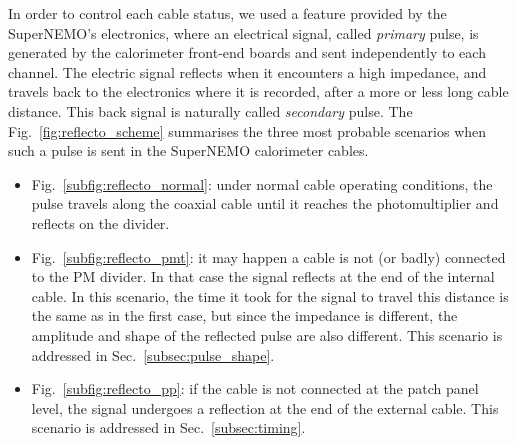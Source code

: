 In order to control each cable status, we used a feature provided by the SuperNEMO's electronics, where an electrical signal, called \emph{primary} pulse, is generated by the calorimeter front-end boards and sent independently to each channel.
The electric signal reflects when it encounters a high impedance, and travels back to the electronics where it is recorded, after a more or less long cable distance.
This back signal is naturally called \emph{secondary} pulse.
The Fig.~\ref{fig:reflecto_scheme} summarises the three most probable scenarios when such a pulse is sent in the SuperNEMO calorimeter cables.
\begin{itemize}
\item Fig.~\ref{subfig:reflecto_normal}: under normal cable operating conditions, the pulse travels along the coaxial cable until it reaches the photomultiplier and reflects on the divider.
\item Fig.~\ref{subfig:reflecto_pmt}: it may happen a cable is not (or badly) connected to the PM divider.
  In that case the signal reflects at the end of the internal cable.
  In this scenario, the time it took for the signal to travel this distance is the same as in the first case, but since the impedance is different, the amplitude and shape of the reflected pulse are also different.
  This scenario is addressed in Sec.~\ref{subsec:pulse_shape}.
\item Fig.~\ref{subfig:reflecto_pp}: if the cable is not connected at the patch panel level, the signal undergoes a reflection at the end of the external cable.
  This scenario is addressed in Sec.~\ref{subsec:timing}.
\end{itemize}
